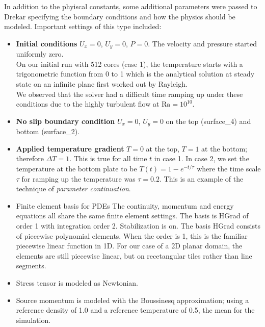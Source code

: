 \documentclass[11pt]{article} %
\begin{document}
In addition to the phyiscal constants, some additional parameters were passed to Drekar 
specifying the boundary conditions and how the physics should be modeled.
Important settings of this type included:
\begin{itemize}
\item{\textbf{Initial conditions}} $U_x = 0$, $U_y = 0$, $P = 0$.  The velocity and pressure started uniformly zero.\\
On our initial run with 512 cores (case 1), the temperature starts with a trigonometric function from 0 to 1
which is the analytical solution at steady state on an infinite plane first worked out by Rayleigh. \\
We observed that the solver had a difficult time ramping up under these conditions 
due to the highly turbulent flow at $\textrm{Ra} = 10^{10}$.  

\item{\textbf{No slip boundary condition}} $U_x = 0$, $U_y = 0$ 
on the top (surface\_4) and bottom (surface\_2).
\item{\textbf{Applied temperature gradient}} $T=0$ at the top, $T=1$ at the bottom; therefore $\Delta T = 1$.
This is true for all time $t$ in case 1.  
In case 2, we set the temperature at the bottom plate to be 
$T(t) = 1 - e^{-t / \tau}$ where the time scale $\tau$ for ramping up the temperature was $\tau = 0.2$.
This is an example of the technique of \textit{parameter continuation}.
\item{Finite element basis for PDEs} The continuity, momentum and energy equations all share the same
finite element settings.  The basis is HGrad of order 1 with integration order 2.  Stabilization is on.
The basis HGrad consists of piecewise polynomial elements.  
When the order is 1, this is the familiar piecewise linear function in 1D.
For our case of a 2D planar domain, the elements are still piecewise linear, 
but on recetangular tiles rather than line segments.
\item{Stress tensor} is modeled as Newtonian.
\item{Source momentum} is modeled with the Boussinesq approximation; 
using a reference density of 1.0 and a reference temperature of 0.5, the mean for the simulation.
\end{itemize}
\end{document}
